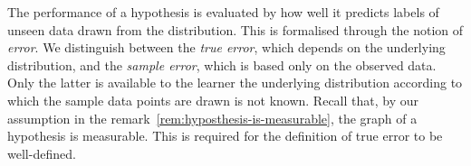 %
%
%
%




The performance of a hypothesis is evaluated by how well it predicts labels of unseen data drawn from the distribution.
This is formalised through the notion of \emph{error}.
We distinguish between the \emph{true error}, which depends on the underlying distribution, and the \emph{sample error}, which is based only on the observed data. Only the latter is available to the learner the underlying distribution according to which the sample data points are drawn is not known. Recall that, by our assumption in the remark~\ref{rem:hyposthesis-is-measurable}, the graph of a hypothesis is measurable. This is required for the definition of true error to be well-defined.


